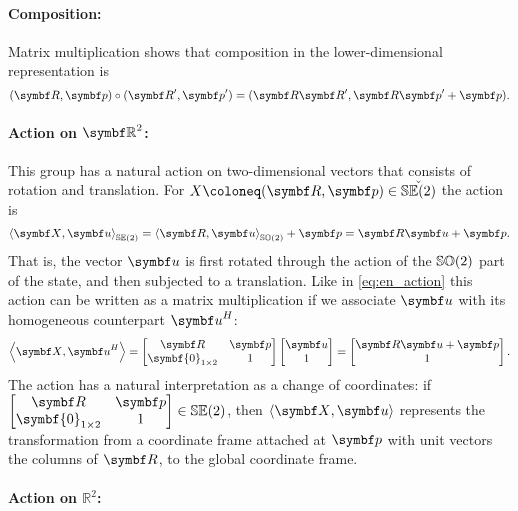 \paragraph{Composition:} Matrix multiplication shows that composition in the lower-dimensional representation is
\begin{equation}
  (\bR, \bp) \circ (\bR', \bp') = (\bR \bR', \bR \bp' + \bp).
\end{equation}

\paragraph{Action on $\mathbb{\bR}^2$:}
This group has a natural action on two-dimensional vectors that consists of rotation and translation. For $X \coloneq (\bR, \bp) \in \check {\SEtwo}$ the action is
\begin{equation}
  \left \langle \X, \bu \right \rangle_{\SEtwo} = \left \langle \bR, \bu \right \rangle_{\SOtwo} + \bp = \bR \bu + \bp.
\end{equation}
That is, the vector $\bu$ is first rotated through the action of the ${\mathbb{SO}(2)}$ part of the state, and then subjected to a translation. Like in \eqref{eq:en_action} this action can be written as a matrix multiplication if we associate $\bu$ with its homogeneous counterpart $\bu^H$:
\begin{equation}
  \left \langle \X, \bu^H \right \rangle = \begin{bmatrix}
    \bR & \bp \\ \symbf{0}_{1 \times 2} & 1
  \end{bmatrix} \begin{bmatrix}
    \symbf u \\ 1
  \end{bmatrix} = \begin{bmatrix}
    \bR \bu + \bp \\ 1
  \end{bmatrix}.
\end{equation}
The action has a natural interpretation as a change of coordinates: if $\begin{bmatrix} \bR & \bp \\ \symbf{0}_{1 \times 2} & 1 \end{bmatrix} \in \SEtwo$, then $\left \langle \X, \bu \right \rangle$ represents the transformation from a coordinate frame attached at $\bp$ with unit vectors the columns of $\bR$, to the global coordinate frame.

\paragraph{Action on $\mathbb{R}^2$:}

